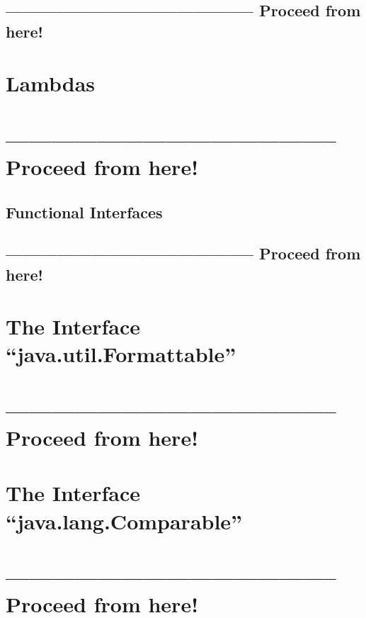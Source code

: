 \documentclass[11pt,a4paper, titlepage, parskip=half, headsepline, footsepline, cleardoublepage=current, headheight=1cm]{scrbook}
\begin{document}
\subsection{-------------------------------------------- Proceed from here!}
\lipsum[5]

\section{Lambdas}\label{sec:Lambdas}
\section{-------------------------------------------- Proceed from here!}
\lipsum[5]

\subsection{Functional Interfaces}\label{sec:FunctionalInterfaces}
\subsection{-------------------------------------------- Proceed from here!}
\lipsum[5]

\section{The Interface “java.util.Formattable”}\label{sec:FormattableInterface}
\section{-------------------------------------------- Proceed from here!}

\autocite{ORACLE_DOC_STRING_CLASS}
\autocite{ORACLE_DOC_STRINGBUFFER_CLASS}
\autocite{ORACLE_DOC_STRINGBUILDER_CLASS}
\autocite{ORACLE_DOC_STRINGJOINER_CLASS}
\autocite{ORACLE_DOC_FORMATTER_CLASS}
\autocite{ORACLE_DOC_FORMATTABLE_INTERFACE}

\lipsum[1]

\section{The Interface “java.lang.Comparable”}\label{sec:ComparableInterface}
\section{-------------------------------------------- Proceed from here!}
\lipsum[5]
\end{document}
